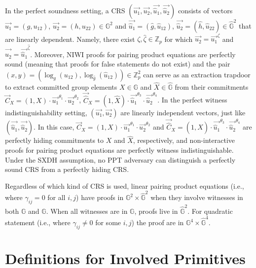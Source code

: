 \documentclass[10pt]{llncs}
\newcommand{\G}{\mathbb{G}}
\newcommand{\Z}{\mathbb{Z}}
\begin{document}
In the perfect soundness setting, a  CRS  $(\vec{u_1},\vec{u_2},\vec{\hat{u}_1},\vec{\hat{u}_2})$ consists of vectors $\vec{u_1}=(g,u_{12})$, $\vec{u_2}=(h,u_{22}) \in \G^2$ and 
$\vec{\hat{u}_1}=(\hat{g},\hat{u}_{12})$, $\vec{\hat{u}_2}=(\hat{h},\hat{u}_{22}) \in \hat{\G}^2$ that are linearly dependent. Namely,  there exist $\zeta,\hat{\zeta} \in \Z_p$ for which $\vec{u_2}=\vec{u_1}^\zeta$ and $\vec{\hat{u}_2} =\vec{\hat{u}_1}^{\hat{\zeta}}$. Moreover, NIWI proofs for pairing product equations are perfectly sound (meaning that proofs for false
statements do not exist)
and the pair $(x,y)=(\log_g(u_{12}),\log_{\hat{g}}(\hat{u}_{12})) \in \Z_p^2$ can 
serve as an extraction trapdoor to extract committed group elements $X \in \G$ and $\hat{X} \in \hat{\G}$ from their commitments 
$\vec{C}_X=(1,X) \cdot \vec{u_1}^{\theta_1} \cdot \vec{u_2}^{\theta_2}$, $\vec{\hat{C}}_X=(1,\hat{X}) \cdot \vec{\hat{u}_1}^{\theta_3} \cdot \vec{\hat{u}_2}^{\theta_4}$.   
In the perfect witness indistinguishability setting, $(\vec{u_1},\vec{u_2})$ are linearly independent vectors, just like $(\vec{\hat{u}_1},\vec{\hat{u}_2})$. In this case,
$\vec{C}_X=(1,X) \cdot \vec{u_1}^{\theta_1} \cdot \vec{u_2}^{\theta_2}$ and $\vec{\hat{C}}_X=(1,\hat{X}) \cdot \vec{\hat{u}_1}^{\theta_3} \cdot \vec{\hat{u}_2}^{\theta_4}$ are 
perfectly hiding commitments to $X$ and $\hat{X}$, respectively, and non-interactive proofs for pairing product equations are perfectly witness indistinguishable. Under the SXDH
assumption, no PPT adversary can distinguish a perfectly sound  CRS from a perfectly hiding CRS.  

Regardless of which kind of CRS is used, linear pairing product equations (i.e., where $\gamma_{ij}=0$ for all $i,j$) have proofs in $\G^2 \times \hat{\G}^2$ when they involve witnesses in both $\G$ and $\hat{\G}$. When 
all witnesses are in $\G$, proofs live in $\hat{\G}^2$. 
For quadratic statement (i.e., where $\gamma_{ij}\neq 0$ for some $i,j$)
the proof are in $\G^4 \times \hat{\G}^4$. 
 




\section{Definitions for Involved Primitives} 

\end{document}
